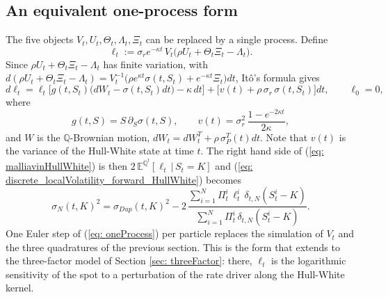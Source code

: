 
\subsection{An equivalent one-process form}\label{subsec: oneProcess}
The five objects $V_t,U_t,\Theta_t,\Lambda_t,\Xi_t$ can be replaced by a single process. Define
$$ \ell_t := \sigma_r e^{-\kappa t}\,V_t\big(\rho U_t+\Theta_t\Xi_t-\Lambda_t\big). $$
Since $\rho U_t+\Theta_t\Xi_t-\Lambda_t$ has finite variation, with
$d(\rho U_t+\Theta_t\Xi_t-\Lambda_t)=V_t^{-1}\big(\rho e^{\kappa t}\sigma(t,S_t)+e^{-\kappa t}\Xi_t\big)dt$,
It\^o's formula gives
\begin{equation}\label{eq: oneProcess}
d\ell_t=\ell_t\Big[g(t,S_t)\big(dW_t-\sigma(t,S_t)dt\big)-\kappa\,dt\Big]
+\Big[v(t)+\rho\,\sigma_r\,\sigma(t,S_t)\Big]dt,\qquad \ell_0=0,
\end{equation}
where
$$ g(t,S)=S\,\partial_S\sigma(t,S),\qquad v(t)=\sigma_r^2\,\frac{1-e^{-2\kappa t}}{2\kappa}, $$
and $W$ is the $\mathbb{Q}$-Brownian motion, $dW_t=dW^T_t+\rho\,\sigma_P^T(t)dt$. Note that $v(t)$ is the variance of the Hull-White state at time $t$.
The right hand side of (\ref{eq: malliavinHullWhite}) is then $2\,\mathbb{E}^{\mathbb{Q}^t}[\ell_t\,|\,S_t=K]$ and (\ref{eq: discrete_localVolatility_forward_HullWhite}) becomes
\begin{equation}\label{eq: oneProcessParticle}
\sigma_N(t,K)^2=\sigma_{Dup}(t,K)^2-2\,\frac{\sum_{i=1}^N\Pi^i_t\,\ell^i_t\,\delta_{t,N}(S^i_t-K)}{\sum_{i=1}^N\Pi^i_t\,\delta_{t,N}(S^i_t-K)} .
\end{equation}
One Euler step of (\ref{eq: oneProcess}) per particle replaces the simulation of $V_t$ and the three quadratures of the previous section. This is the form that extends to the three-factor model of Section \ref{sec: threeFactor}: there, $\ell_t$ is the logarithmic sensitivity of the spot to a perturbation of the rate driver along the Hull-White kernel.
